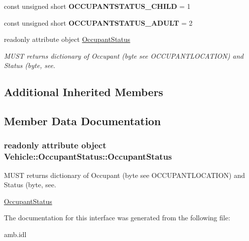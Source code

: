 \begin{DoxyCompactItemize}
\item 
\hypertarget{interfaceVehicle_1_1OccupantStatus_a49e74852dac1a8fbe5ad296ee4f499e8}{const unsigned short {\bfseries O\-C\-C\-U\-P\-A\-N\-T\-S\-T\-A\-T\-U\-S\-\_\-\-C\-H\-I\-L\-D} = 1}\label{interfaceVehicle_1_1OccupantStatus_a49e74852dac1a8fbe5ad296ee4f499e8}

\item 
\hypertarget{interfaceVehicle_1_1OccupantStatus_aa756e4d0709a58c27c88cc1273bc8344}{const unsigned short {\bfseries O\-C\-C\-U\-P\-A\-N\-T\-S\-T\-A\-T\-U\-S\-\_\-\-A\-D\-U\-L\-T} = 2}\label{interfaceVehicle_1_1OccupantStatus_aa756e4d0709a58c27c88cc1273bc8344}

\item 
readonly attribute object \hyperlink{interfaceVehicle_1_1OccupantStatus_a5b76c696a6be933d1f67135fff83463a}{Occupant\-Status}
\begin{DoxyCompactList}\small\item\em M\-U\-S\-T returns dictionary of Occupant (byte see O\-C\-C\-U\-P\-A\-N\-T\-L\-O\-C\-A\-T\-I\-O\-N) and Status (byte, see. \end{DoxyCompactList}\end{DoxyCompactItemize}
\subsection*{Additional Inherited Members}


\subsection{Member Data Documentation}
\hypertarget{interfaceVehicle_1_1OccupantStatus_a5b76c696a6be933d1f67135fff83463a}{
\subsubsection[{Occupant\-Status}]{\setlength{\rightskip}{0pt plus 5cm}readonly attribute object Vehicle\-::\-Occupant\-Status\-::\-Occupant\-Status}}\label{interfaceVehicle_1_1OccupantStatus_a5b76c696a6be933d1f67135fff83463a}


M\-U\-S\-T returns dictionary of Occupant (byte see O\-C\-C\-U\-P\-A\-N\-T\-L\-O\-C\-A\-T\-I\-O\-N) and Status (byte, see. 

\hyperlink{interfaceVehicle_1_1OccupantStatus}{Occupant\-Status} 

The documentation for this interface was generated from the following file\-:\begin{DoxyCompactItemize}
\item 
amb.\-idl\end{DoxyCompactItemize}
